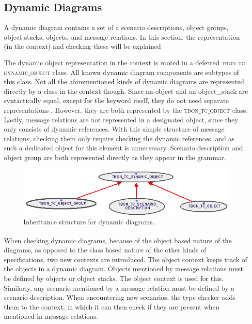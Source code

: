 \subsection{Dynamic Diagrams}
A dynamic diagram contains a set of a scenario descriptions, object groups, object stacks, objects, and message relations. In this section, the representation (in the context) and checking these will be explained

The dynamic object representation in the context is rooted in a deferred \textsc{tbon$\_$tc$\_$dynamic$\_$object} class. All known dynamic diagram components are subtypes of this class. Not all the aforementioned kinds of dynamic diagrams are represented directly by a class in the context though. Since an object and an object\_stack are syntactically equal, except for the keyword itself, they do not need separate representations \cite[p. 358]{walden1995}. However, they are both represented by the \textsc{tbon$\_$tc$\_$object} class. Lastly, message relations are not represented in a designated object, since they only consists of dynamic references. With this simple structure of message relations, checking them only require checking the dynamic references, and as such a dedicated object for this element is unnecessary. Scenario description and object group are both represented directly as they appear in the grammar.

\begin{figure}[h]
\centerline{
\includegraphics[scale=0.7]{images/dynamic-diagram.png}
}
\caption{Inheritance structure for dynamic diagrams.}
\label{fig:dynamic-diagram}
\end{figure}

\paragraph{}
When checking dynamic diagrams, because of the object based nature of the diagrams, as opposed to the class based nature of the other kinds of specifications, two new contexts are introduced. The object context keeps track of the objects in a dynamic diagram. Objects mentioned by message relations must be defined by objects or object stacks. The object context is used for this. Similarly, any scenario mentioned by a message relation must be defined by a scenario description. When encountering new scenarios, the type checker adds them to the context, in which it can then check if they are present when mentioned in message relations.

